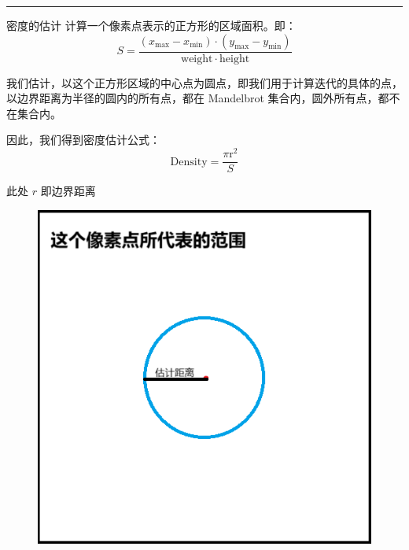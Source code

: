 \documentclass{article}
\begin{document}
\hrule
\vspace{3em}
{\footnotesize
$\textbf{密度的估计}$ 计算一个像素点表示的正方形的区域面积。即：$$S = \frac{(x_{\max} - x_{\min}) \cdot (y_{\max}-y_{\min})}{\mathrm{weight} \cdot \mathrm{height}}$$

                     我们估计，以这个正方形区域的中心点为圆点，即我们用于计算迭代的具体的点，以边界距离为半径的圆内的所有点，都在 Mandelbrot 集合内，圆外所有点，都不在集合内。

                     因此，我们得到密度估计公式：$$\mathrm{Density} = \frac{\pi \mathrm{r}^2}{S}$$

                     此处 $r$ 即边界距离
}

\begin{figure}[H]
    \centering
    \includegraphics[scale=0.5]{pic.png}
\end{figure}
\end{document}
